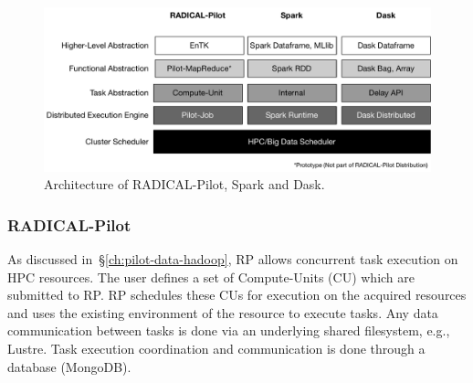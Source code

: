 \begin{figure}[ht]
    \centering
    \includegraphics[width=.95\textwidth]{figures/data_analytics_hpc/task_par/bigdata_framework_stack.pdf}
    \caption{Architecture of RADICAL-Pilot, Spark and Dask.}
    \label{fig:figures_bigdata_framework_stack}
\end{figure}

\subsubsection*{RADICAL-Pilot}


As discussed in~\S\ref{ch:pilot-data-hadoop}, RP allows concurrent
task execution on HPC resources. The user defines a set of Compute-Units (CU)
which are submitted to RP. RP schedules these CUs for
execution on the acquired resources and uses the existing environment of the
resource to execute tasks. Any data communication between tasks is done via an
underlying shared filesystem, e.g., Lustre. Task execution coordination and
communication is done through a database (MongoDB).

